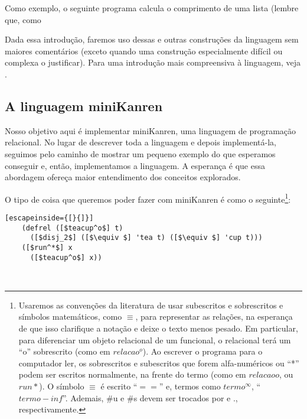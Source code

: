   Como exemplo, o seguinte programa calcula o comprimento de uma lista
  (lembre que, como 

  Dada essa introdução, faremos uso dessas e outras construções da
  linguagem sem maiores comentários (exceto quando uma construção
  especialmente difícil ou complexa o justificar). Para uma introdução
  mais compreensiva à linguagem, veja \cite{kent}.

  \subsection{A linguagem miniKanren}

  Nosso objetivo aqui é implementar miniKanren, uma linguagem de
  programação relacional. No lugar de descrever toda a linguagem e
  depois implementá-la, seguimos pelo caminho de mostrar um pequeno
  exemplo do que esperamos conseguir e, então, implementamos a
  linguagem. A esperança é que essa abordagem ofereça maior
  entendimento dos conceitos explorados.

  O tipo de coisa que queremos poder fazer com miniKanren é como o
  seguinte\footnote{Usaremos as convenções da literatura de usar
    subescritos e sobrescritos e símbolos matemáticos, como $\equiv $, para
    representar as relações, na esperança de que isso clarifique a
    notação e deixe o texto menos pesado. Em particular, para
    diferenciar um objeto relacional de um funcional, o relacional
    terá um ``o'' sobrescrito (como em $relacao^o$). Ao escrever o
    programa para o computador ler, os sobrescritos e subescritos que
    forem alfa-numéricos ou ``*'' podem ser escritos normalmente, na
    frente do termo (como em $relacaoo$, ou $run*$). O símbolo $\equiv$ é
    escrito ``$==$'' e, termos como $termo^\infty$,
    ``$termo-inf$''. Ademais, \#u e \#s devem ser trocados por
     e ., respectivamente.}:
  \\

  \begin{lstlisting}[escapeinside={[}{]}]
    (defrel ([$teacup^o$] t)
      ([$disj_2$] ([$\equiv $] 'tea t) ([$\equiv $] 'cup t)))
    ([$run^*$] x
      ([$teacup^o$] x))
  \end{lstlisting}
  \hspace{1cm} \seta {}\\



